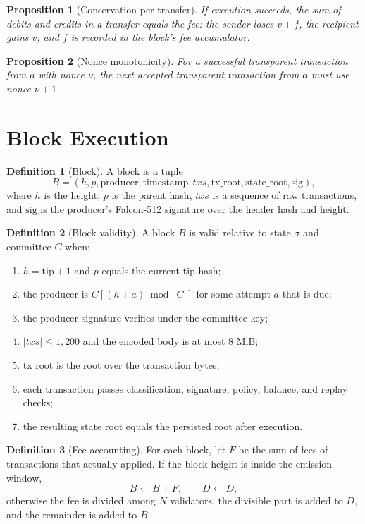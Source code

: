 \documentclass[11pt,a4paper]{article}
\theoremstyle{definition}
\newtheorem{definition}{Definition}[section]
\theoremstyle{plain}
\newtheorem{proposition}{Proposition}[section]
\begin{document}
\begin{proposition}[Conservation per transfer]
If execution succeeds, the sum of debits and credits in a transfer equals the
fee: the sender loses $v+f$, the recipient gains $v$, and $f$ is recorded in
the block's fee accumulator.
\end{proposition}

\begin{proposition}[Nonce monotonicity]
For a successful transparent transaction from $a$ with nonce $\nu$, the next
accepted transparent transaction from $a$ must use nonce $\nu+1$.
\end{proposition}

\section{Block Execution}

\begin{definition}[Block]
A block is a tuple
\[
  B=(h,p,\mathrm{producer},\mathrm{timestamp},txs,\mathrm{tx\_root},
  \mathrm{state\_root},\mathrm{sig}),
\]
where $h$ is the height, $p$ is the parent hash, $txs$ is a sequence of raw
transactions, and $\mathrm{sig}$ is the producer's Falcon-512 signature over
the header hash and height.
\end{definition}

\begin{definition}[Block validity]
A block $B$ is valid relative to state $\sigma$ and committee $C$ when:
\begin{enumerate}[leftmargin=*]
  \item $h=\mathrm{tip}+1$ and $p$ equals the current tip hash;
  \item the producer is $C[(h+a)\bmod |C|]$ for some attempt $a$ that is due;
  \item the producer signature verifies under the committee key;
  \item $|txs|\le 1{,}200$ and the encoded body is at most 8 MiB;
  \item $\mathrm{tx\_root}$ is the root over the transaction bytes;
  \item each transaction passes classification, signature, policy, balance,
        and replay checks;
  \item the resulting state root equals the persisted root after execution.
\end{enumerate}
\end{definition}

\begin{definition}[Fee accounting]
For each block, let $F$ be the sum of fees of transactions that actually
applied. If the block height is inside the emission window,
\[
  B\leftarrow B+F,\qquad D\leftarrow D,
\]
otherwise the fee is divided among $N$ validators, the divisible part is
added to $D$, and the remainder is added to $B$.
\end{definition}
\end{document}
